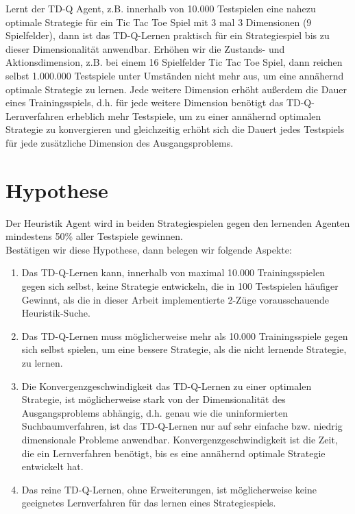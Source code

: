 Lernt der TD-Q Agent, z.B. innerhalb von 10.000 Testspielen eine nahezu optimale Strategie für ein Tic Tac Toe Spiel mit 3 mal 3 Dimensionen (9 Spielfelder), dann ist das TD-Q-Lernen praktisch für ein Strategiespiel bis zu dieser Dimensionalität anwendbar. Erhöhen wir die Zustands- und Aktionsdimension, z.B. bei einem 16 Spielfelder Tic Tac Toe Spiel, dann reichen selbst 1.000.000 Testspiele unter Umständen nicht mehr aus, um eine annähernd optimale Strategie zu lernen. Jede weitere Dimension erhöht außerdem die Dauer eines Trainingsspiels, d.h. für jede weitere Dimension benötigt das TD-Q-Lernverfahren erheblich mehr Testspiele, um zu einer annähernd optimalen Strategie zu konvergieren und gleichzeitig erhöht sich die Dauert jedes Testspiels für jede zusätzliche Dimension des Ausgangsproblems.

\section{Hypothese}
\label{sec:Hypothese}
Der Heuristik Agent wird in beiden Strategiespielen gegen den lernenden Agenten mindestens 50\% aller Testspiele gewinnen.\\

Bestätigen wir diese Hypothese, dann belegen wir folgende Aspekte:

\begin{enumerate}
\item Das TD-Q-Lernen kann, innerhalb von maximal 10.000 Trainingsspielen gegen sich selbst, keine Strategie entwickeln, die in 100 Testspielen häufiger Gewinnt, als die in dieser Arbeit implementierte 2-Züge vorausschauende Heuristik-Suche.
\item Das TD-Q-Lernen muss möglicherweise mehr als 10.000 Trainingsspiele gegen sich selbst spielen, um eine bessere Strategie, als die nicht lernende Strategie, zu lernen.
\item Die Konvergenzgeschwindigkeit das TD-Q-Lernen zu einer optimalen Strategie, ist möglicherweise stark von der Dimensionalität des Ausgangsproblems abhängig, d.h. genau wie die uninformierten Suchbaumverfahren, ist das TD-Q-Lernen nur auf sehr einfache bzw. niedrig dimensionale Probleme anwendbar. Konvergenzgeschwindigkeit ist die Zeit, die ein Lernverfahren benötigt, bis es eine annähernd optimale Strategie entwickelt hat.
\item Das reine TD-Q-Lernen, ohne Erweiterungen, ist möglicherweise keine geeignetes Lernverfahren für das lernen eines Strategiespiels.  
\end{enumerate}








